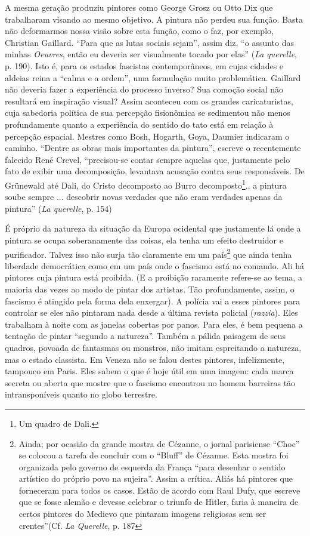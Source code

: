 A mesma geração produziu pintores como George Grosz ou Otto Dix que
trabalharam visando ao mesmo objetivo. A pintura não perdeu sua função.
Basta não deformarmos nossa visão sobre esta função, como o faz, por
exemplo, Christian Gaillard. ``Para que as lutas sociais sejam'', assim
diz, ``o assunto das minhas \emph{Oeuvres}, então eu deveria ser
visualmente tocado por elas'' (\emph{La querelle}, p. 190). Isto é, para
os estados fascistas contemporâneos, em cujas cidades e aldeias reina a
``calma e a ordem'', uma formulação muito problemática. Gaillard não
deveria fazer a experiência do processo inverso? Sua comoção social não
resultará em inspiração visual? Assim aconteceu com os grandes
caricaturistas, cuja sabedoria política de sua percepção fisionômica se
sedimentou não menos profundamente quanto a experiência do sentido do
tato está em relação à percepção espacial. Mestres como Bosh, Hogarth,
Goya, Daumier indicaram o caminho. ``Dentre as obras mais importantes da
pintura'', escreve o recentemente falecido René Crevel, ``precisou-se
contar sempre aquelas que, justamente pelo fato de exibir uma
decomposição, levantava acusação contra seus responsáveis. De Grünewald
até Dali, do Cristo decomposto ao Burro decomposto\footnote{Um quadro de
  Dali.}.. a pintura soube sempre ... descobrir novas verdades que não
eram verdades apenas da pintura'' (\emph{La querelle}, p. 154)

É próprio da natureza da situação da Europa ocidental que justamente lá
onde a pintura se ocupa soberanamente das coisas, ela tenha um efeito
destruidor e purificador. Talvez isso não surja tão claramente em um
país\footnote{Ainda; por ocasião da grande mostra de Cézanne, o jornal
  parisiense ``Choc'' se colocou a tarefa de concluir com o ``Bluff'' de
  Cézanne. Esta mostra foi organizada pelo governo de esquerda da França
  ``para desenhar o sentido artístico do próprio povo na sujeira''.
  Assim a crítica. Aliás há pintores que forneceram para todos os casos.
  Estão de acordo com Raul Dufy, que escreve que se fosse alemão e
  devesse celebrar o triunfo de Hitler, faria à maneira de certos
  pintores do Medievo que pintaram imagens religiosas sem ser
  crentes''(Cf. \emph{La Querelle}, p. 187} que ainda tenha liberdade
democrática como em um país onde o fascismo está no comando. Ali há
pintores cuja pintura está proibida. (E a proibição raramente refere-se
ao tema, a maioria das vezes ao modo de pintar dos artistas. Tão
profundamente, assim, o fascismo é atingido pela forma dela enxergar). A
polícia vai a esses pintores para controlar se eles não pintaram nada
desde a última revista policial (\emph{razzia}). Eles trabalham à noite
com as janelas cobertas por panos. Para eles, é bem pequena a tentação
de pintar ``segundo a natureza''. Também a pálida paisagem de seus
quadros, povoada de fantasmas ou monstros, não imitam espreitando a
natureza, mas o estado classista. Em Veneza não se falou destes
pintores, infelizmente, tampouco em Paris. Eles sabem o que é hoje útil
em uma imagem: cada marca secreta ou aberta que mostre que o fascismo
encontrou no homem barreiras tão intransponíveis quanto no globo
terrestre.
